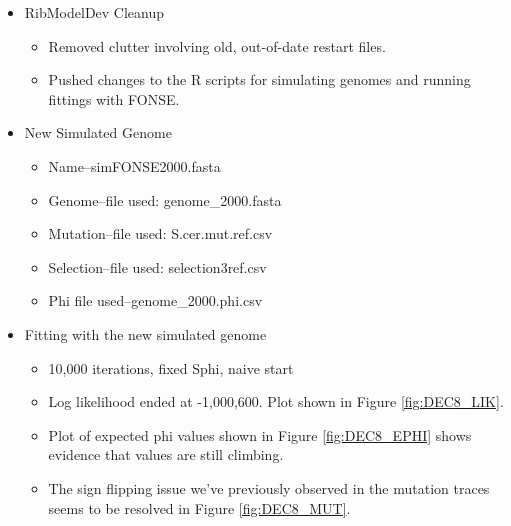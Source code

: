 \documentclass[11pt]{labbook}
\begin{document}
    \begin{itemize}
        \item RibModelDev Cleanup
            \begin{itemize}
                \item Removed clutter involving old, out-of-date restart files.
                \item Pushed changes to the R scripts for simulating genomes and running fittings with FONSE.
            \end{itemize}
        \item New Simulated Genome
            \begin{itemize}
                \item Name--simFONSE2000.fasta
                \item Genome--file used: genome\_2000.fasta
                \item Mutation--file used: S.cer.mut.ref.csv
                \item Selection--file used: selection3ref.csv
                \item Phi file used--genome\_2000.phi.csv
            \end{itemize}
        \item Fitting with the new simulated genome
            \begin{itemize}
                \item 10,000 iterations, fixed Sphi, naive start
                \item Log likelihood ended at -1,000,600. Plot shown in Figure \ref{fig:DEC8_LIK}.
                \item Plot of expected phi values shown in Figure \ref{fig:DEC8_EPHI} shows evidence that values are still climbing.
                \item The sign flipping issue we've previously observed in the mutation traces seems to be resolved in Figure \ref{fig:DEC8_MUT}.
            \end{itemize}
    \end{itemize}
    
\end{document}
